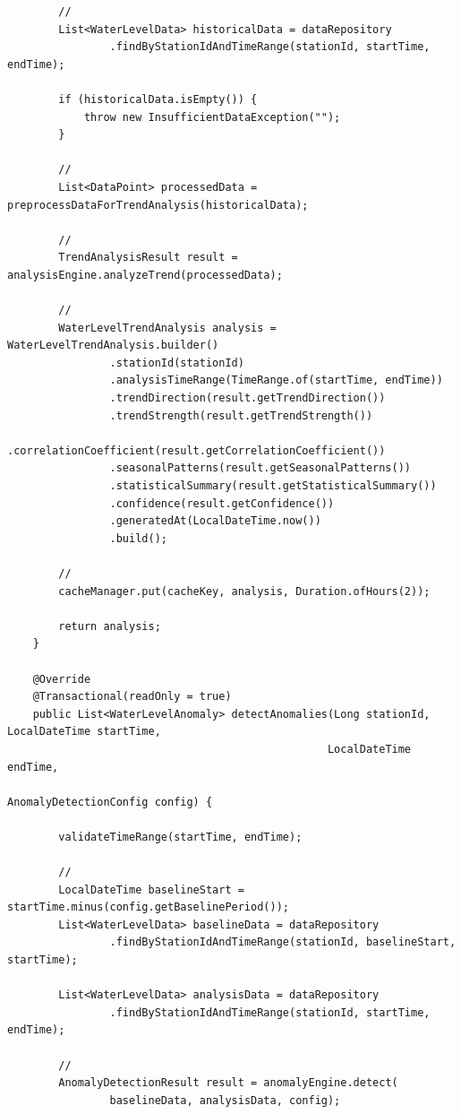 \begin{verbatim}
        // 
        List<WaterLevelData> historicalData = dataRepository
                .findByStationIdAndTimeRange(stationId, startTime, endTime);
        
        if (historicalData.isEmpty()) {
            throw new InsufficientDataException("");
        }
        
        // 
        List<DataPoint> processedData = preprocessDataForTrendAnalysis(historicalData);
        
        // 
        TrendAnalysisResult result = analysisEngine.analyzeTrend(processedData);
        
        // 
        WaterLevelTrendAnalysis analysis = WaterLevelTrendAnalysis.builder()
                .stationId(stationId)
                .analysisTimeRange(TimeRange.of(startTime, endTime))
                .trendDirection(result.getTrendDirection())
                .trendStrength(result.getTrendStrength())
                .correlationCoefficient(result.getCorrelationCoefficient())
                .seasonalPatterns(result.getSeasonalPatterns())
                .statisticalSummary(result.getStatisticalSummary())
                .confidence(result.getConfidence())
                .generatedAt(LocalDateTime.now())
                .build();
        
        // 
        cacheManager.put(cacheKey, analysis, Duration.ofHours(2));
        
        return analysis;
    }
    
    @Override
    @Transactional(readOnly = true)  
    public List<WaterLevelAnomaly> detectAnomalies(Long stationId, LocalDateTime startTime,
                                                  LocalDateTime endTime,
                                                  AnomalyDetectionConfig config) {
        
        validateTimeRange(startTime, endTime);
        
        // 
        LocalDateTime baselineStart = startTime.minus(config.getBaselinePeriod());
        List<WaterLevelData> baselineData = dataRepository
                .findByStationIdAndTimeRange(stationId, baselineStart, startTime);
                
        List<WaterLevelData> analysisData = dataRepository
                .findByStationIdAndTimeRange(stationId, startTime, endTime);
        
        // 
        AnomalyDetectionResult result = anomalyEngine.detect(
                baselineData, analysisData, config);
        

\end{verbatim}
